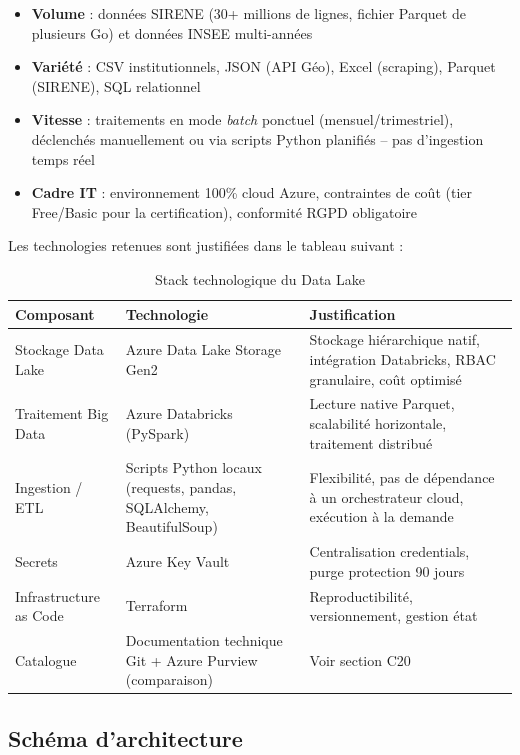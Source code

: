 \documentclass[12pt,a4paper]{article}
\begin{document}
\begin{itemize}
  \item \textbf{Volume} : données SIRENE (30+ millions de lignes, fichier Parquet de plusieurs Go) et données INSEE multi-années
  \item \textbf{Variété} : CSV institutionnels, JSON (API Géo), Excel (scraping), Parquet (SIRENE), SQL relationnel
  \item \textbf{Vitesse} : traitements en mode \textit{batch} ponctuel (mensuel/trimestriel), déclenchés manuellement ou via scripts Python planifiés -- pas d'ingestion temps réel
  \item \textbf{Cadre IT} : environnement 100\% cloud Azure, contraintes de coût (tier Free/Basic pour la certification), conformité RGPD obligatoire
\end{itemize}

Les technologies retenues sont justifiées dans le tableau suivant :

\begin{table}[H]
\centering
\small
\begin{tabular}{L{3.5cm} L{4cm} L{6cm}}
  \toprule
  \textbf{Composant} & \textbf{Technologie} & \textbf{Justification} \\
  \midrule
  Stockage Data Lake & Azure Data Lake Storage Gen2 & Stockage hiérarchique natif, intégration Databricks, RBAC granulaire, coût optimisé \\
  Traitement Big Data & Azure Databricks (PySpark) & Lecture native Parquet, scalabilité horizontale, traitement distribué \\
  Ingestion / ETL & Scripts Python locaux (requests, pandas, SQLAlchemy, BeautifulSoup) & Flexibilité, pas de dépendance à un orchestrateur cloud, exécution à la demande \\
  Secrets & Azure Key Vault & Centralisation credentials, purge protection 90 jours \\
  Infrastructure as Code & Terraform & Reproductibilité, versionnement, gestion état \\
  Catalogue & Documentation technique Git + Azure Purview (comparaison) & Voir section C20 \\
  \bottomrule
\end{tabular}
\caption{Stack technologique du Data Lake}
\end{table}

\subsection{Schéma d'architecture}
\end{document}

